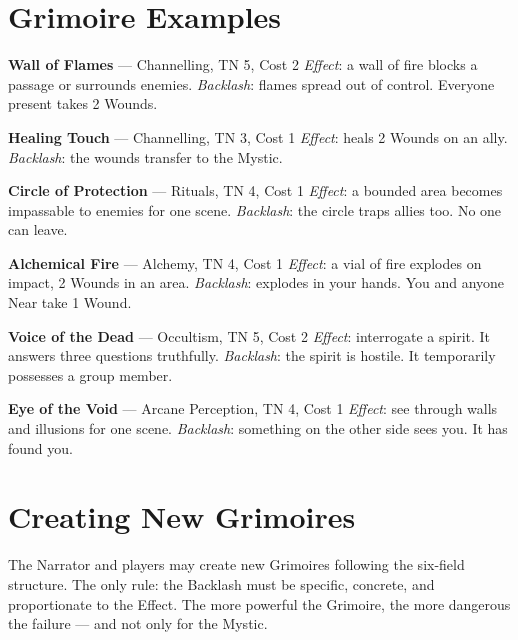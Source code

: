 \documentclass[10pt,a4paper]{article}
\begin{document}
\section*{Grimoire Examples}

\textbf{Wall of Flames} — Channelling, TN 5, Cost 2 \textit{Effect}: a wall of fire blocks a passage or surrounds enemies. \textit{Backlash}: flames spread out of control. Everyone present takes 2 Wounds.


\textbf{Healing Touch} — Channelling, TN 3, Cost 1 \textit{Effect}: heals 2 Wounds on an ally. \textit{Backlash}: the wounds transfer to the Mystic.


\textbf{Circle of Protection} — Rituals, TN 4, Cost 1 \textit{Effect}: a bounded area becomes impassable to enemies for one scene. \textit{Backlash}: the circle traps allies too. No one can leave.


\textbf{Alchemical Fire} — Alchemy, TN 4, Cost 1 \textit{Effect}: a vial of fire explodes on impact, 2 Wounds in an area. \textit{Backlash}: explodes in your hands. You and anyone Near take 1 Wound.


\textbf{Voice of the Dead} — Occultism, TN 5, Cost 2 \textit{Effect}: interrogate a spirit. It answers three questions truthfully. \textit{Backlash}: the spirit is hostile. It temporarily possesses a group member.


\textbf{Eye of the Void} — Arcane Perception, TN 4, Cost 1 \textit{Effect}: see through walls and illusions for one scene. \textit{Backlash}: something on the other side sees you. It has found you.


\section*{Creating New Grimoires}

The Narrator and players may create new Grimoires following the six-field structure. The only rule: the Backlash must be specific, concrete, and proportionate to the Effect. The more powerful the Grimoire, the more dangerous the failure — and not only for the Mystic.


\end{document}
